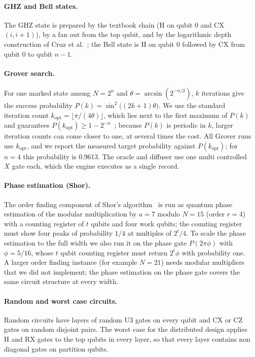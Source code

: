 \documentclass[pdflatex,sn-mathphys-num]{sn-jnl}
\theoremstyle{thmstyleone}
\theoremstyle{thmstylethree}
\begin{document}
\paragraph{GHZ and Bell states.} The GHZ state is prepared by the textbook chain (H on qubit 0 and CX$(i,i+1)$), by a
fan out from the top qubit, and by the logarithmic depth construction of Cruz et al.~\cite{cruz2019efficient};
the Bell state is H on qubit 0 followed by CX from qubit 0 to qubit $n-1$.

\paragraph{Grover search.} For one marked state among $N = 2^n$ and $\theta = \arcsin(2^{-n/2})$, $k$ iterations give
the success probability $P(k) = \sin^2\bigl((2k+1)\theta\bigr)$. We use the standard iteration count
$k_{\mathrm{opt}} = \lfloor \pi/(4\theta) \rfloor$, which lies next to the first maximum of $P(k)$ and guarantees
$P(k_{\mathrm{opt}}) \ge 1 - 2^{-n}$~\cite{boyer1998tight,grover1996fast}; because $P(k)$ is periodic in $k$, larger
iteration counts can come closer to one, at several times the cost. All Grover runs use $k_{\mathrm{opt}}$, and we
report the measured target probability against $P(k_{\mathrm{opt}})$; for $n=4$ this probability is 0.9613. The oracle
and diffuser use one multi controlled $X$ gate each, which the engine executes as a single record.

\paragraph{Phase estimation (Shor).} The order finding component of Shor's algorithm~\cite{shor1997polynomial} is
run as quantum phase estimation of the modular multiplication by $a = 7$ modulo $N = 15$ (order $r = 4$) with a
counting register of $t$ qubits and four work qubits; the counting register must show four peaks of probability $1/4$
at multiples of $2^t/4$. To scale the phase estimation to the full width we also run it on the phase gate $P(2\pi\phi)$
with $\phi = 5/16$, whose $t$ qubit counting register must return $2^t\phi$ with probability one. A larger order
finding instance (for example $N = 21$) needs modular multipliers that we did not implement; the phase estimation on
the phase gate covers the same circuit structure at every width.

\paragraph{Random and worst case circuits.} Random circuits have layers of random U3 gates on every qubit and CX or
CZ gates on random disjoint pairs. The worst case for the distributed design applies H and RX gates to the top qubits
in every layer, so that every layer contains non diagonal gates on partition qubits.
\end{document}
